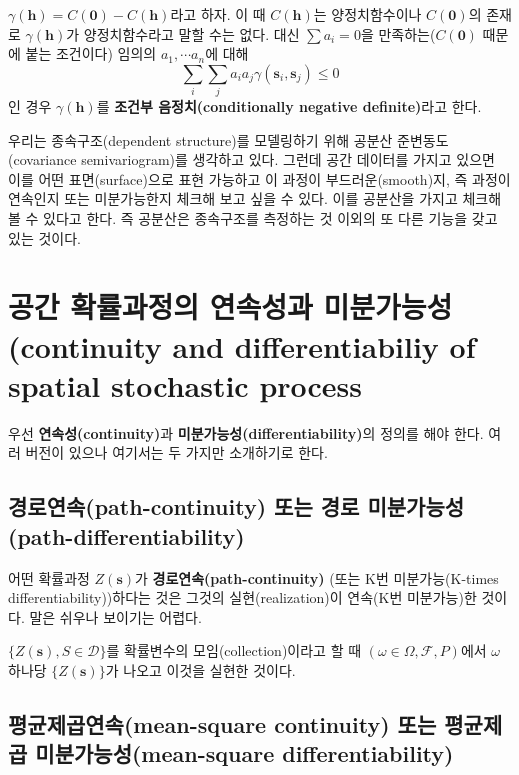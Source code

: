 \documentclass[b5paper,]{book}
\theoremstyle{definition}
\theoremstyle{definition}
\theoremstyle{definition}
\theoremstyle{remark}
\begin{document}
\(\gamma(\mathbf{h})=C(\mathbf{0})-C(\mathbf{h})\)라고 하자. 이 때
\(C(\mathbf{h})\)는 양정치함수이나 \(C(\mathbf{0})\)의 존재로
\(\gamma(\mathbf{h})\)가 양정치함수라고 말할 수는 없다. 대신
\(\sum a_{i}=0\)을 만족하는(\(C(\mathbf{0})\) 때문에 붙는 조건이다)
임의의 \(a_{1}, \cdots a_{n}\)에 대해
\[\sum_{i}\sum_{j}a_{i}a_{j}\gamma(\mathbf{s}_{i},\mathbf{s}_{j}) \leq 0\]
인 경우 \(\gamma(\mathbf{h})\)를 \textbf{조건부 음정치(conditionally
negative definite)}라고 한다.

우리는 종속구조(dependent structure)를 모델링하기 위해 공분산
준변동도(covariance semivariogram)를 생각하고 있다. 그런데 공간 데이터를
가지고 있으면 이를 어떤 표면(surface)으로 표현 가능하고 이 과정이
부드러운(smooth)지, 즉 과정이 연속인지 또는 미분가능한지 체크해 보고
싶을 수 있다. 이를 공분산을 가지고 체크해 볼 수 있다고 한다. 즉 공분산은
종속구조를 측정하는 것 이외의 또 다른 기능을 갖고 있는 것이다.

\section{공간 확률과정의 연속성과 미분가능성(continuity and
differentiabiliy of spatial stochastic
process}\label{---continuity-and-differentiabiliy-of-spatial-stochastic-process}

우선 \textbf{연속성(continuity)}과
\textbf{미분가능성(differentiability)}의 정의를 해야 한다. 여러 버전이
있으나 여기서는 두 가지만 소개하기로 한다.

\subsection{경로연속(path-continuity) 또는 경로
미분가능성(path-differentiability)}\label{path-continuity---path-differentiability}

어떤 확률과정 \(Z(\mathbf{s})\)가 \textbf{경로연속(path-continuity)}
(또는 K번 미분가능(K-times differentiability))하다는 것은 그것의
실현(realization)이 연속(K번 미분가능)한 것이다. 말은 쉬우나 보이기는
어렵다.

\(\{ Z(\mathbf{s}) , S \in \mathcal{D}\}\)를 확률변수의
모임(collection)이라고 할 때 \((\omega \in \Omega, \mathcal{F}, P)\)에서
\(\omega\) 하나당 \(\{ Z(\mathbf{s})\}\)가 나오고 이것을 실현한 것이다.

\subsection{평균제곱연속(mean-square continuity) 또는 평균제곱
미분가능성(mean-square
differentiability)}\label{mean-square-continuity---mean-square-differentiability}
\end{document}
